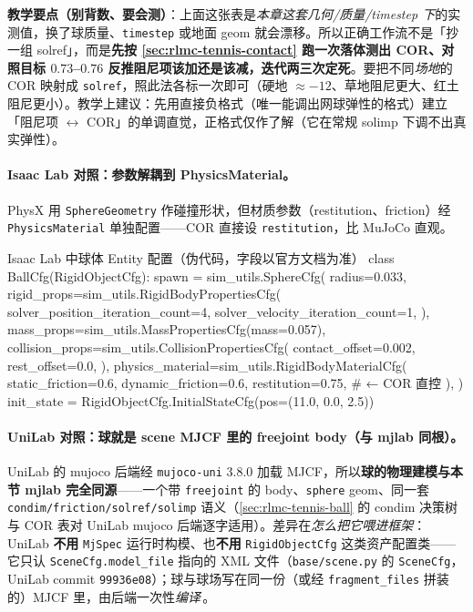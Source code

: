 \textbf{教学要点（别背数、要会测）}：上面这张表是\emph{本章这套几何/质量/timestep 下}的实测值，换了球质量、\verb|timestep| 或地面 geom 就会漂移。所以正确工作流不是「抄一组 solref」，而是\textbf{先按 \cref{sec:rlmc-tennis-contact} 跑一次落体测出 COR、对照目标 $0.73$--$0.76$ 反推阻尼项该加还是该减，迭代两三次定死}。要把不同\emph{场地}的 COR 映射成 \verb|solref|，照此法各标一次即可（硬地 $\approx-12$、草地阻尼更大、红土阻尼更小）。教学上建议：先用直接负格式（唯一能调出网球弹性的格式）建立「阻尼项 $\leftrightarrow$ COR」的单调直觉，正格式仅作了解（它在常规 solimp 下调不出真实弹性）。

\paragraph{Isaac Lab 对照：参数解耦到 PhysicsMaterial。}PhysX 用 \verb|SphereGeometry| 作碰撞形状，但材质参数（restitution、friction）经 \verb|PhysicsMaterial| 单独配置——COR 直接设 \verb|restitution|，比 MuJoCo 直观。

\begin{codebox}[Python]{Isaac Lab 中球体 Entity 配置（伪代码，字段以官方文档为准）}
class BallCfg(RigidObjectCfg):
    spawn = sim_utils.SphereCfg(
        radius=0.033,
        rigid_props=sim_utils.RigidBodyPropertiesCfg(
            solver_position_iteration_count=4,
            solver_velocity_iteration_count=1,
        ),
        mass_props=sim_utils.MassPropertiesCfg(mass=0.057),
        collision_props=sim_utils.CollisionPropertiesCfg(
            contact_offset=0.002, rest_offset=0.0,
        ),
        physics_material=sim_utils.RigidBodyMaterialCfg(
            static_friction=0.6, dynamic_friction=0.6, restitution=0.75,  # ← COR 直控
        ),
    )
    init_state = RigidObjectCfg.InitialStateCfg(pos=(11.0, 0.0, 2.5))
\end{codebox}

\paragraph{UniLab 对照：球就是 scene MJCF 里的 freejoint body（与 mjlab 同根）。}UniLab 的 mujoco 后端经 \verb|mujoco-uni| 3.8.0 加载 MJCF，所以\textbf{球的物理建模与本节 mjlab 完全同源}——一个带 \verb|freejoint| 的 body、\verb|sphere| geom、同一套 \verb|condim/friction/solref/solimp| 语义（\cref{sec:rlmc-tennis-ball} 的 condim 决策树与 COR 表对 UniLab mujoco 后端逐字适用）。差异在\emph{怎么把它喂进框架}：UniLab \textbf{不用} \verb|MjSpec| 运行时构模、也\textbf{不用} \verb|RigidObjectCfg| 这类资产配置类——它只认 \verb|SceneCfg.model_file| 指向的 XML 文件（\verb|base/scene.py| 的 \verb|SceneCfg|，UniLab commit \texttt{99936e08}）；球与球场写在同一份（或经 \verb|fragment_files| 拼装的）MJCF 里，由后端一次性\emph{编译}\,\cite{unilab2026}。

